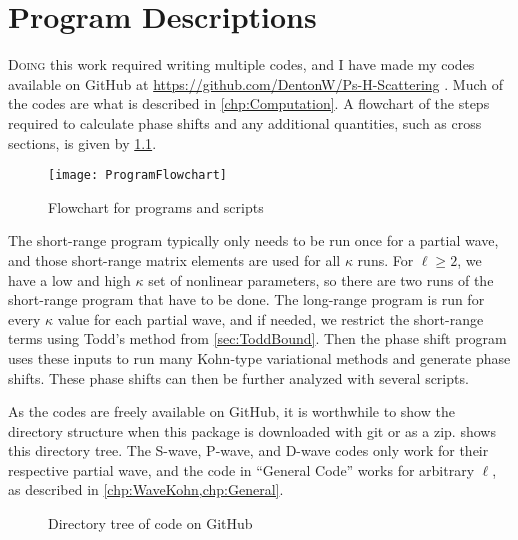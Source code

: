 \documentclass[Dissertation.tex]{subfiles}
\begin{document}
\chapter{Program Descriptions}
\label{chp:Programs}

\lettrine{\textcolor{startcolor}{D}}{oing} this work required writing multiple
codes, and I have made my codes available on GitHub at 
\url{https://github.com/DentonW/Ps-H-Scattering} \cite{GitHub}. Much of the
codes are what is described in \cref{chp:Computation}. A flowchart of the
steps required to calculate phase shifts and any additional quantities, such
as cross sections, is given by \cref{fig:ProgramFlowchart}.

\begin{figure}
	\centering
	\texttt{[image: ProgramFlowchart]}
	\caption{Flowchart for programs and scripts}
	\label{fig:ProgramFlowchart}
\end{figure}

The short-range program typically only needs to be run once for a partial wave,
and those short-range matrix elements are used for all $\kappa$ runs. For
$\ell \geq 2$, we have a low and high $\kappa$ set of nonlinear parameters, so
there are two runs of the short-range program that have to be done. The
long-range program is run for every $\kappa$ value for each partial wave, and
if needed, we restrict the short-range terms using Todd's method from
\cref{sec:ToddBound}. Then the phase shift program uses these inputs to run
many Kohn-type variational methods and generate phase shifts. These phase shifts
can then be further analyzed with several scripts.


As the codes are freely available on GitHub, it is worthwhile to show the
directory structure when this package is downloaded with git or as a zip.
 shows this directory tree. The S-wave, P-wave, and D-wave
codes only work for their respective partial wave, and the code in ``General 
Code'' works for arbitrary $\ell$, as described in \cref{chp:WaveKohn,chp:General}.

\begin{figure}[H]
\label{fig:directory}       
\caption{Directory tree of code on GitHub \cite{GitHub}}
\label{fig:dirtree}
\end{figure}
\end{document}
